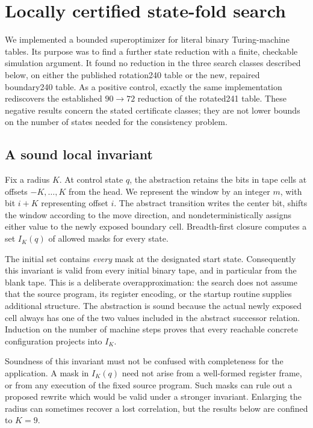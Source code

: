 \section{Locally certified state-fold search}
\label{sec:local-fold-search}

We implemented a bounded superoptimizer for literal binary Turing-machine
tables.  Its purpose was to find a further state reduction with a finite,
checkable simulation argument.  It found no reduction in the three search
classes described below, on either the published rotation240 table or the
new, repaired boundary240 table.  As a positive control, exactly the same
implementation rediscovers the established $90\to72$ reduction of the
rotated241 table.  These negative results concern the stated certificate
classes; they are not lower bounds on the number of states needed for the
consistency problem.

\subsection{A sound local invariant}

Fix a radius $K$.  At control state $q$, the abstraction retains the bits
in tape cells at offsets $-K,\ldots,K$ from the head.  We represent the
window by an integer $m$, with bit $i+K$ representing offset $i$.  The
abstract transition writes the center bit, shifts the window according
to the move direction, and nondeterministically assigns either value to
the newly exposed boundary cell.  Breadth-first closure computes a set
$I_K(q)$ of allowed masks for every state.

The initial set contains \emph{every} mask at the designated start state.
Consequently this invariant is valid from every initial binary tape, and
in particular from the blank tape.  This is a deliberate overapproximation:
the search does not assume that the source program, its register encoding,
or the startup routine supplies additional structure.  The abstraction
is sound because the actual newly exposed cell always has one of the two
values included in the abstract successor relation.  Induction on the
number of machine steps proves that every reachable concrete
configuration projects into $I_K$.

Soundness of this invariant must not be confused with completeness for
the application.  A mask in $I_K(q)$ need not arise from a well-formed
register frame, or from any execution of the fixed source program.
Such masks can rule out a proposed rewrite which would be valid under a
stronger invariant.  Enlarging the radius can sometimes recover a lost
correlation, but the results below are confined to $K=9$.

